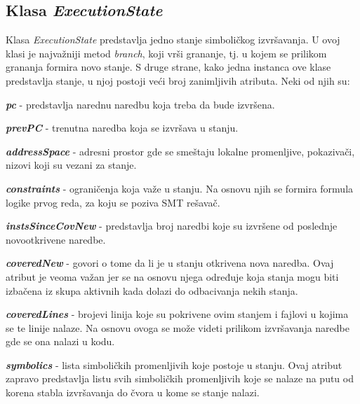 \documentclass[12pt,oneside]{memoir}
\begin{document}
\subsection{Klasa \textit{ExecutionState}}
Klasa \textit{ExecutionState} predstavlja jedno stanje simboličkog izvršavanja. U ovoj klasi je najvažniji metod \textit{branch}, koji vrši grananje, tj. u kojem se prilikom grananja formira novo stanje. S druge strane, kako jedna instanca ove klase predstavlja stanje, u njoj postoji veći broj zanimljivih atributa. Neki od njih su:

\begin{description}
    \item \textbf{\textit{pc}} - predstavlja narednu naredbu koja treba da bude izvršena.
    
    \item \textbf{\textit{prevPC}} - trenutna naredba koja se izvršava u stanju.
    
    \item \textbf{\textit{addressSpace}} - adresni prostor gde se smeštaju lokalne promenljive, pokazivači, nizovi koji su vezani za stanje.
    
    \item \textbf{\textit{constraints}} - ograničenja koja važe u stanju. Na osnovu njih se formira formula logike prvog reda, za koju se poziva SMT rešavač.
    
    \item \textbf{\textit{instsSinceCovNew}} - predstavlja broj naredbi koje su izvršene od poslednje novootkrivene naredbe.
    
    \item \textbf{\textit{coveredNew}} - govori o tome da li je u stanju otkrivena nova naredba. Ovaj atribut je veoma važan jer se na osnovu njega određuje koja stanja mogu biti izbačena iz skupa aktivnih kada dolazi do odbacivanja nekih stanja.
    
    \item \textbf{\textit{coveredLines}} - brojevi linija koje su pokrivene ovim stanjem i fajlovi u kojima se te linije nalaze. Na osnovu ovoga se može videti prilikom izvršavanja naredbe gde se ona nalazi u kodu.
    
    \item \textbf{\textit{symbolics}} - lista simboličkih promenljivih koje postoje u stanju. Ovaj atribut zapravo predstavlja listu svih simboličkih promenljivih koje se nalaze na putu od korena stabla izvršavanja do čvora u kome se stanje nalazi.
\end{description}
\end{document}
